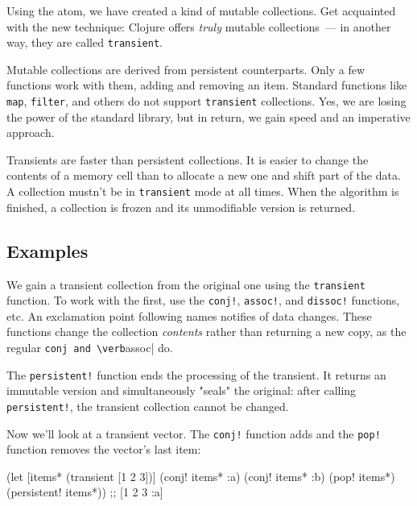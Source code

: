 
Using the atom, we have created a kind of mutable collections.
Get acquainted with the new technique: Clojure offers \emph{truly} mutable collections~--- in another way, they are called \verb|transient|.

Mutable collections are derived from persistent counterparts.
Only a few functions work with them, adding and removing an item.
Standard functions like \verb|map|, \verb|filter|, and others do not support \verb|transient| collections.
Yes, we are losing the power of the standard library, but in return, we gain speed and an imperative approach.

Transients are faster than persistent collections.
It is easier to change the contents of a memory cell than to allocate a new one and shift part of the data.
A collection mustn't be in \verb|transient| mode at all times.
When the algorithm is finished, a collection is frozen and its unmodifiable version is returned.

\subsection{Examples}

We gain a transient collection from the original one using the \verb|transient| function.
To work with the first, use the \verb|conj!|, \verb|assoc!|, and \verb|dissoc!| functions, etc.
An exclamation point following names notifies of data changes.
These functions change the collection \emph{contents} rather than returning a new copy, as the regular \verb|conj and \verb|assoc| do.


The \verb|persistent!| function ends the processing of the transient.
It returns an immutable version and simultaneously "seals" the original: after calling \verb|persistent!|, the transient collection cannot be changed.

Now we'll look at a transient vector.
The \verb|conj!| function adds and the \verb|pop!| function removes the vector's last item:

\begin{clojure}
(let [items* (transient [1 2 3])]
  (conj! items* :a)
  (conj! items* :b)
  (pop! items*)
  (persistent! items*))
;; [1 2 3 :a]
\end{clojure}


